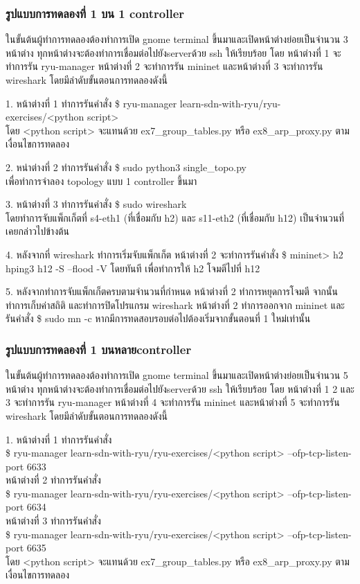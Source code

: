 \subsubsection*{รูปแบบการทดลองที่ 1 บน 1 \gls{controller}}

ในขั้นต้นผู้ทำการทดลองต้องทำการเปิด gnome terminal ขึ้นมาและเปิดหน้าต่างย่อยเป็นจำนวน 3 หน้าต่าง
ทุกหน้าต่างจะต้องทำการเชื่อมต่อไปยัง\gls{server}ด้วย ssh ให้เรียบร้อย
โดย หน้าต่างที่ 1 จะทำการรัน ryu-manager หน้าต่างที่ 2 จะทำการรัน mininet และหน้าต่างที่ 3 จะทำการรัน wireshark
โดยมีลำดับขั้นตอนการทดลองดังนี้


1. หน้าต่างที่ 1 ทำการรันคำสั่ง    
\$ ryu-manager learn-sdn-with-ryu/ryu-exercises/<python script> \\
โดย <python script> จะแทนด้วย ex7\_group\_tables.py หรือ ex8\_arp\_proxy.py ตามเงื่อนไขการทดลอง

2. หน่าต่างที่ 2 ทำการรันคำสั่ง    
\$ sudo python3 single\_topo.py \\
เพื่อทำการจำลอง topology แบบ 1 \gls{controller} ขึ้นมา

3. หน้าต่างที่ 3 ทำการรันคำสั่ง 
\$ sudo wireshark \\
โดยทำการจับแพ็กเก็ตที่ s4-eth1 (ที่เชื่อมกับ h2) และ s11-eth2 (ที่เชื่อมกับ h12) เป็นจำนวนที่เคยกล่าวไปข้างต้น

4. หลังจากที่ wireshark ทำการเริ่มจับแพ็กเก็ต หน้าต่างที่ 2 จะทำการรันคำสั่ง \$ mininet> h2 hping3 h12 -S --flood -V
โดยทันที เพื่อทำการให้ h2 โจมตีไปที่ h12

5. หลังจากทำการจับแพ็กเก็ตครบตามจำนวนที่กำหนด หน้าต่างที่ 2 ทำการหยุดการโจมตี จากนั้นทำการเก็บค่าสถิติ และทำการปิดโปรแกรม wireshark
หน้าต่างที่ 2 ทำการออกจาก mininet และรันคำสั่ง \$ sudo mn -c หากมีการทดสอบรอบต่อไปต้องเริ่มจากขั้นตอนที่ 1 ใหม่เท่านั้น

\subsubsection*{รูปแบบการทดลองที่ 1 บนหลาย\gls{controller}}

ในขั้นต้นผู้ทำการทดลองต้องทำการเปิด gnome terminal ขึ้นมาและเปิดหน้าต่างย่อยเป็นจำนวน 5 หน้าต่าง
ทุกหน้าต่างจะต้องทำการเชื่อมต่อไปยัง\gls{server}ด้วย ssh ให้เรียบร้อย
โดย หน้าต่างที่ 1 2 และ 3 จะทำการรัน ryu-manager หน้าต่างที่ 4 จะทำการรัน mininet และหน้าต่างที่ 5 จะทำการรัน wireshark
โดยมีลำดับขั้นตอนการทดลองดังนี้

1. หน้าต่างที่ 1 ทำการรันคำสั่ง \\
\$ ryu-manager learn-sdn-with-ryu/ryu-exercises/<python script> --ofp-tcp-listen-port 6633 \\
\indent หน้าต่างที่ 2 ทำการรันคำสั่ง \\
\$ ryu-manager learn-sdn-with-ryu/ryu-exercises/<python script> --ofp-tcp-listen-port 6634  \\
\indent หน้าต่างที่ 3 ทำการรันคำสั่ง \\
\$ ryu-manager learn-sdn-with-ryu/ryu-exercises/<python script> --ofp-tcp-listen-port 6635  \\
โดย <python script> จะแทนด้วย 
ex7\_group\_tables.py หรือ ex8\_arp\_proxy.py
ตามเงื่อนไขการทดลอง

